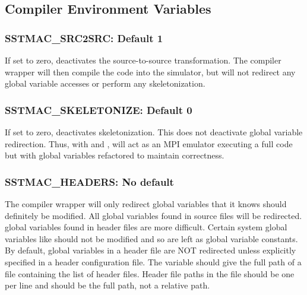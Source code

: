 \subsection{Compiler Environment Variables}

\subsubsection{SSTMAC\_SRC2SRC: Default 1}
If set to zero, deactivates the source-to-source transformation. 
The compiler wrapper will then compile the code into the simulator, but will not redirect any global variable accesses or perform any skeletonization.

\subsubsection{SSTMAC\_SKELETONIZE: Default 0}
If set to zero, deactivates skeletonization. 
This does not deactivate global variable redirection.
Thus, with  and ,
\sstmacro will act as an MPI emulator executing a full code but with global variables refactored to maintain correctness.


\subsubsection{SSTMAC\_HEADERS: No default}
The compiler wrapper will only redirect global variables that it knows should definitely be modified.
All global variables found in source files will be redirected.
 global variables found in header files are more difficult.
Certain system global variables like  should not be modified and so are left as global variable constants.
By default, global variables in a header file are NOT redirected unless explicitly specified in a header configuration file.
The variable  should give the full path of a file containing the list of header files.
Header file paths in the file should be one per line and should be the full path, not a relative path.

